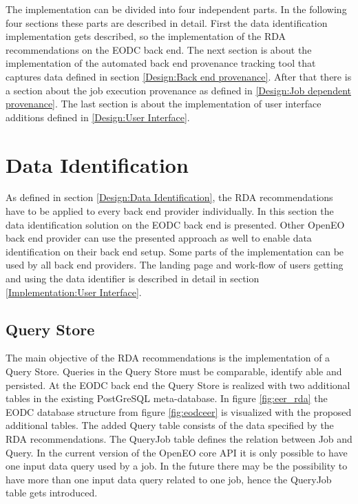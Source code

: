 \documentclass[draft,final]{vutinfth} %
\begin{document}
The implementation can be divided into four independent parts. In the following four sections these parts are described in detail. First the data identification implementation gets described, so the implementation of the RDA recommendations on the EODC back end. The next section is about the implementation of the automated back end provenance tracking tool that captures data defined in section \ref{Design:Back end provenance}. After that there is a section about the job execution provenance as defined in \ref{Design:Job dependent provenance}. The last section is about the implementation of user interface additions defined in \ref{Design:User Interface}.     

\section{Data Identification}\label{Implementation:Data Identification}

As defined in section \ref{Design:Data Identification}, the RDA recommendations have to be applied to every back end provider individually. In this section the data identification solution on the EODC back end is presented. Other OpenEO back end provider can use the presented approach as well to enable data identification on their back end setup. Some parts of the implementation can be used by all back end providers. The landing page and work-flow of users getting and using the data identifier is described in detail in section \ref{Implementation:User Interface}. \\

\subsection{Query Store}
The main objective of the RDA recommendations is the implementation of a Query Store. Queries in the Query Store must be comparable, identify able and persisted. At the EODC back end the Query Store is realized with two additional tables in the existing PostGreSQL meta-database. In figure \ref{fig:eer_rda} the EODC database structure from figure \ref{fig:eodceer} is visualized with the proposed additional tables. The added Query table consists of the data specified by the RDA recommendations. The QueryJob table defines the relation between Job and Query. In the current version of the OpenEO core API it is only possible to have one input data query used by a job. In the future there may be the possibility to have more than one input data query related to one job, hence the QueryJob table gets introduced. 
\end{document}
